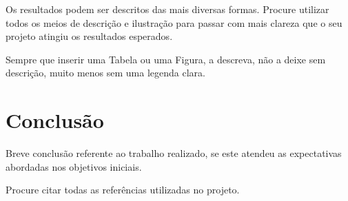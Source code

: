 \documentclass[
	12pt,				%
	openright,			%
	oneside,			%
	a4paper,			%
	brazil,				%
	]{abntex2}
\begin{document}
    Os resultados podem ser descritos das mais diversas formas. Procure utilizar todos os meios de descrição e ilustração para passar com mais clareza que o seu projeto atingiu os resultados esperados. 
    
    Sempre que inserir uma Tabela ou uma Figura, a descreva, não a deixe sem descrição, muito menos sem uma legenda clara.

\chapter{Conclusão}
    Breve conclusão referente ao trabalho realizado, se este atendeu as expectativas abordadas nos objetivos iniciais. 
    
%

    Procure citar todas as referências utilizadas no projeto.
\end{document}

